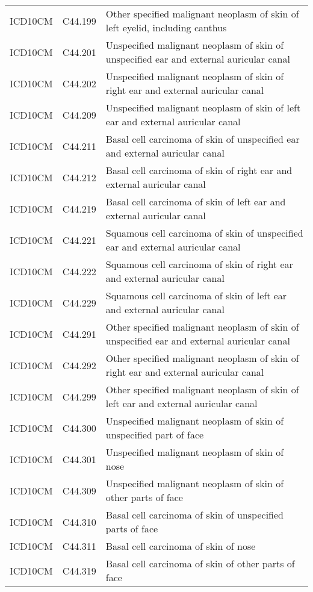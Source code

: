 \begin{longtable}{p{}p{}p{}}
  ICD10CM & C44.199 & Other specified malignant neoplasm of skin of left eyelid, including canthus \\ 
  ICD10CM & C44.201 & Unspecified malignant neoplasm of skin of unspecified ear and external auricular canal \\ 
  ICD10CM & C44.202 & Unspecified malignant neoplasm of skin of right ear and external auricular canal \\ 
  ICD10CM & C44.209 & Unspecified malignant neoplasm of skin of left ear and external auricular canal \\ 
  ICD10CM & C44.211 & Basal cell carcinoma of skin of unspecified ear and external auricular canal \\ 
  ICD10CM & C44.212 & Basal cell carcinoma of skin of right ear and external auricular canal \\ 
  ICD10CM & C44.219 & Basal cell carcinoma of skin of left ear and external auricular canal \\ 
  ICD10CM & C44.221 & Squamous cell carcinoma of skin of unspecified ear and external auricular canal \\ 
  ICD10CM & C44.222 & Squamous cell carcinoma of skin of right ear and external auricular canal \\ 
  ICD10CM & C44.229 & Squamous cell carcinoma of skin of left ear and external auricular canal \\ 
  ICD10CM & C44.291 & Other specified malignant neoplasm of skin of unspecified ear and external auricular canal \\ 
  ICD10CM & C44.292 & Other specified malignant neoplasm of skin of right ear and external auricular canal \\ 
  ICD10CM & C44.299 & Other specified malignant neoplasm of skin of left ear and external auricular canal \\ 
  ICD10CM & C44.300 & Unspecified malignant neoplasm of skin of unspecified part of face \\ 
  ICD10CM & C44.301 & Unspecified malignant neoplasm of skin of nose \\ 
  ICD10CM & C44.309 & Unspecified malignant neoplasm of skin of other parts of face \\ 
  ICD10CM & C44.310 & Basal cell carcinoma of skin of unspecified parts of face \\ 
  ICD10CM & C44.311 & Basal cell carcinoma of skin of nose \\ 
  ICD10CM & C44.319 & Basal cell carcinoma of skin of other parts of face \\ 

\end{longtable}

